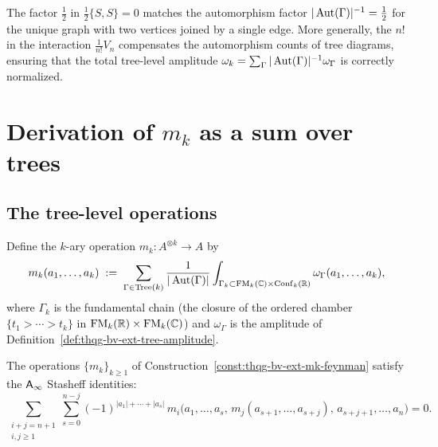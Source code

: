 \begin{remark}
The factor $\tfrac{1}{2}$ in $\tfrac{1}{2}\{S,S\} = 0$ matches the
automorphism factor $|\operatorname{Aut}(\Gamma)|^{-1} = \tfrac{1}{2}$ for the
unique graph with two vertices joined by a single edge. More
generally, the $n!$ in the interaction $\frac{1}{n!}V_n$ compensates
the automorphism counts of tree diagrams, ensuring that the total
tree-level amplitude $\omega_k = \sum_\Gamma |\operatorname{Aut}(\Gamma)|^{-1}
\omega_\Gamma$ is correctly normalized.
\end{remark}


\section{Derivation of \texorpdfstring{$m_k$}{m\_k} as a sum over
trees}
\label{sec:thqg-bv-ext-mk-derivation}
\subsection{The tree-level operations}

\begin{construction}
\label{const:thqg-bv-ext-mk-feynman}
Define the $k$-ary operation $m_k : A^{\otimes k} \to A$ by
\begin{equation}
m_k(a_1, \ldots, a_k)
\;:=\;
\sum_{\Gamma \in \mathrm{Tree}(k)}
\frac{1}{|\operatorname{Aut}(\Gamma)|}
\int_{\Gamma_k \subset \operatorname{FM}_k(\mathbb{C}) \times \operatorname{Conf}_k(\mathbb{R})}
\omega_\Gamma(a_1, \ldots, a_k),
\end{equation}
where $\Gamma_k$ is the fundamental chain (the closure of the
ordered chamber $\{t_1 > \cdots > t_k\}$ in
$\operatorname{FM}_k(\mathbb{R}) \times \operatorname{FM}_k(\mathbb{C})$) and
$\omega_\Gamma$ is the amplitude of
Definition~\ref{def:thqg-bv-ext-tree-amplitude}.
\end{construction}

\begin{theorem}
The operations $\{m_k\}_{k \ge 1}$ of
Construction~\ref{const:thqg-bv-ext-mk-feynman} satisfy the
$\mathsf{A}_{\infty}$ Stasheff identities:
\begin{equation}
\sum_{\substack{i + j = n + 1 \\ i, j \ge 1}}
\sum_{s=0}^{n-j}
(-1)^{|a_1| + \cdots + |a_s|}
\,m_i\bigl(a_1, \ldots, a_s,\,
m_j(a_{s+1}, \ldots, a_{s+j}),\,
a_{s+j+1}, \ldots, a_n\bigr)
= 0.
\end{equation}
\end{theorem}

